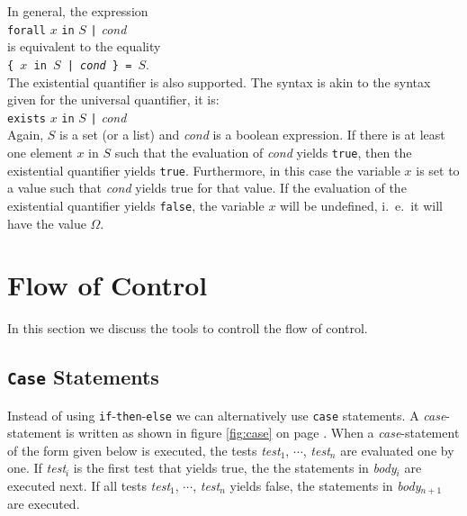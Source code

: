 In general, the expression 
\\[0.2cm]
\hspace*{1.3cm}
\texttt{forall} $x$ \texttt{in} $S$ \texttt{|} \textsl{cond}
\\[0.2cm]
is equivalent to the equality
\\[0.2cm]
\hspace*{1.3cm}
\texttt{\{ $x$ in $S$ | \textsl{cond} \} = $S$}.
\\[0.2cm]
The existential quantifier is also supported.
The syntax is akin to the syntax given for the universal quantifier, it is:
\\[0.2cm]
\hspace*{1.3cm}
\texttt{exists} $x$ \texttt{in} $S$ \texttt{|} \textsl{cond}
\\[0.2cm]
Again,  $S$ is a set (or a list) and \textsl{cond} is a boolean expression. 
If there is at least one element $x$ in $S$ such that the evaluation of \textsl{cond}
yields \texttt{true},  then the existential quantifier yields  \texttt{true}.
Furthermore, in this case the variable  $x$ is set to a value such that  \textsl{cond}
yields true for that value.   If the evaluation of the existential quantifier yields 
 \texttt{false}, the variable  $x$ will be undefined, i.~e.~it will have the value
 $\Omega$.

\section{Flow of Control}
In this section we discuss the tools to controll the flow of control.

\subsection{\texttt{Case} Statements}
Instead of using  \texttt{if}-\texttt{then}-\texttt{else} we can alternatively
use  \texttt{case} statements.  A \textsl{case}-statement is written as shown in figure 
\ref{fig:case} on page \pageref{fig:case}.  When a \textsl{case}-statement of the form
given below is executed, the tests
 \textsl{test}$_1$, $\cdots$, \textsl{test}$_n$ are evaluated one by one.
If  \textsl{test}$_i$ is the first test that yields true, the the statements in
\textsl{body}$_i$ are executed next.  If all tests 
\textsl{test}$_1$, $\cdots$, \textsl{test}$_n$
yields false, the statements in \textsl{body}$_{n+1}$ are executed.

